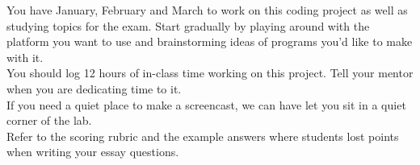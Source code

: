 \documentclass{42-en}
\begin{document}
You have January, February and March to work on this coding project as well as studying topics for the exam. Start gradually by playing around with the platform you want to use and brainstorming ideas of programs you'd like to make with it.\\

You should log 12 hours of in-class time working on this project. Tell your mentor when you are dedicating time to it.\\

If you need a quiet place to make a screencast, we can have let you sit in a quiet corner of the lab.\\

Refer to the scoring rubric and the example answers where students lost points when writing your essay questions.\\
\end{document}
